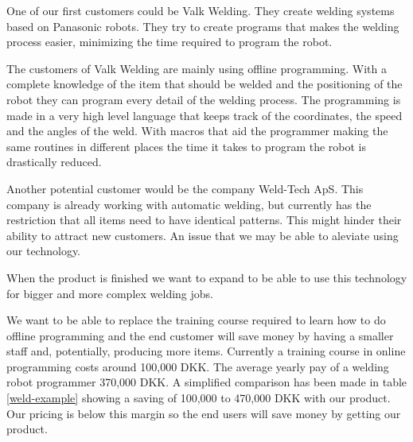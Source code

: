 One of our first customers could be Valk Welding. They create welding systems based on Panasonic robots. They try to create programs that makes the welding process easier, minimizing the time required to program the robot.

The customers of Valk Welding are mainly using offline programming.
With a complete knowledge of the item that should be welded and the positioning of the robot they can program every detail of the welding process.
The programming is made in a very high level language that keeps track of the coordinates, the speed and the angles of the weld.
With macros that aid the programmer making the same routines in different places the time it takes to program the robot is drastically reduced.


Another potential customer would be the company Weld-Tech ApS. 
This company is already working with automatic welding, but currently has the restriction that all items need to have identical patterns. 
This might hinder their ability to attract new customers. An issue that we may be able to aleviate using our technology.

When the product is finished we want to expand to be able to use this technology for bigger and more complex welding jobs.

We want to be able to replace the training course required to learn how to do offline programming and the end customer will save money by having a smaller staff and, potentially, producing more items. 
Currently a training course in online programming costs around 100,000 DKK\cite{valk_welding_summary}. 
The average yearly pay of a welding robot programmer 370,000 DKK\cite{welding_salary}. 
A simplified comparison has been made in table \ref{weld-example} showing a saving of 100,000 to 470,000 DKK with our product.
Our pricing is below this margin so the end users will save money by getting our product.

